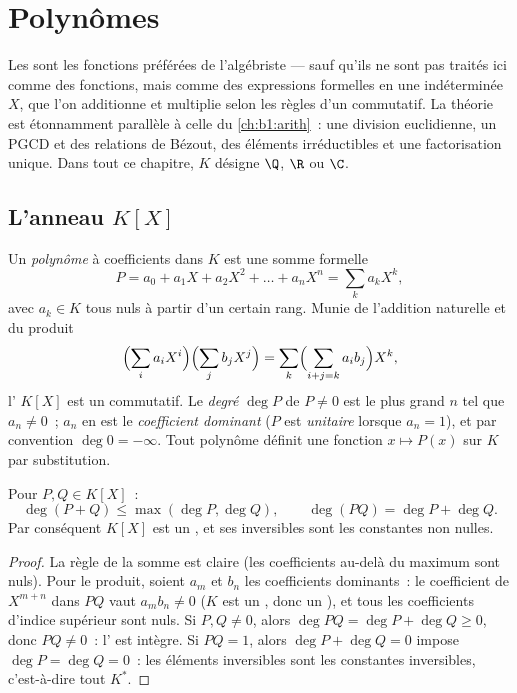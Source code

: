 \chapter{Polynômes}\label{ch:b1:poly}

Les  sont les fonctions préférées de l'algébriste --- sauf
qu'ils ne sont pas traités ici comme des fonctions, mais comme des
expressions formelles en une indéterminée $X$, que l'on additionne et
multiplie selon les règles d'un  commutatif. La théorie est
étonnamment parallèle à celle du \cref{ch:b1:arith}~: une division
euclidienne, un PGCD et des relations de Bézout, des éléments
irréductibles et une factorisation unique. Dans tout ce chapitre, $K$
désigne $\Q$, $\R$ ou $\C$.

\section{L'anneau $K[X]$}

\begin{definition}\label{def:b1:poly:def}
Un \emph{polynôme} à coefficients dans $K$ est une
somme formelle
\[
P = a_0 + a_1 X + a_2 X^2 + \dots + a_n X^n
= \sum_{k} a_k X^k,
\]
avec $a_k \in K$ tous nuls à partir d'un certain rang. Munie de
l'addition naturelle et du produit
\[
\Bigl(\sum_i a_i X^i\Bigr)\Bigl(\sum_j b_j X^j\Bigr)
= \sum_k \Bigl(\sum_{i+j=k} a_i b_j\Bigr) X^k,
\]
l' $K[X]$ est un  commutatif. Le \emph{degré} $\deg P$ de
$P \neq 0$ est le plus grand $n$ tel que $a_n \neq 0$~; $a_n$ en est le
\emph{coefficient dominant} ($P$ est \emph{unitaire} lorsque $a_n = 1$), et par convention $\deg 0 = -\infty$.
Tout polynôme définit une fonction $x \mapsto P(x)$ sur $K$ par
substitution.
\end{definition}

\begin{proposition}\label{prop:b1:poly:degree}
Pour $P, Q \in K[X]$~:
\[
\deg(P + Q) \leq \max(\deg P, \deg Q),
\qquad
\deg(PQ) = \deg P + \deg Q .
\]
Par conséquent $K[X]$ est un , et ses inversibles sont
les constantes non nulles.
\end{proposition}

\begin{proof}
La règle de la somme est claire (les coefficients au-delà du maximum
sont nuls). Pour le produit, soient $a_m$ et $b_n$ les coefficients
dominants~: le coefficient de $X^{m+n}$ dans $PQ$ vaut $a_m b_n \neq 0$
($K$ est un , donc un ), et tous les coefficients
d'indice supérieur sont nuls. Si $P, Q \neq 0$, alors $\deg PQ = \deg P
+ \deg Q \geq 0$, donc $PQ \neq 0$~: l' est intègre. Si $PQ = 1$,
alors $\deg P + \deg Q = 0$ impose $\deg P = \deg Q = 0$~: les éléments
inversibles sont les constantes inversibles, c'est-à-dire tout $K^*$.
\end{proof}

